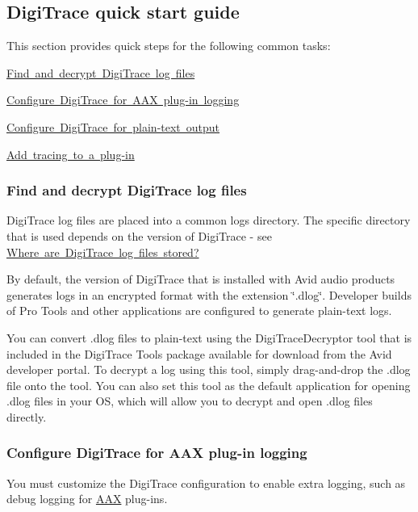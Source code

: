  \hypertarget{a00834_digitrace__quickstart}{}\subsection{Digi\+Trace quick start guide}\label{a00834_digitrace__quickstart}
 This section provides quick steps for the following common tasks\+: \begin{DoxyItemize}
\item \mbox{\hyperlink{a00834_digitrace__gettingstarted__logfiles}{Find and decrypt Digi\+Trace log files}} \item \mbox{\hyperlink{a00834_digitrace__gettingstarted__config}{Configure Digi\+Trace for A\+AX plug-\/in logging}} \item \mbox{\hyperlink{a00834_digitrace__gettingstarted__configurefordevelopment}{Configure Digi\+Trace for plain-\/text output}} \item \mbox{\hyperlink{a00834_digitrace__gettingstarted__addingtracing}{Add tracing to a plug-\/in}}\end{DoxyItemize}
\hypertarget{a00834_digitrace__gettingstarted__logfiles}{}\subsubsection{Find and decrypt Digi\+Trace log files}\label{a00834_digitrace__gettingstarted__logfiles}
 Digi\+Trace log files are placed into a common logs directory. The specific directory that is used depends on the version of Digi\+Trace -\/ see \mbox{\hyperlink{a00834_digitrace__logfiles__wherearethelogs}{Where are Digi\+Trace log files stored?}}

 By default, the version of Digi\+Trace that is installed with Avid audio products generates logs in an encrypted format with the extension \char`\"{}.\+dlog\char`\"{}. Developer builds of Pro Tools and other applications are configured to generate plain-\/text logs.

 You can convert .dlog files to plain-\/text using the Digi\+Trace\+Decryptor tool that is included in the Digi\+Trace Tools package available for download from the Avid developer portal. To decrypt a log using this tool, simply drag-\/and-\/drop the .dlog file onto the tool. You can also set this tool as the default application for opening .dlog files in your OS, which will allow you to decrypt and open .dlog files directly.

\hypertarget{a00834_digitrace__gettingstarted__config}{}\subsubsection{Configure Digi\+Trace for A\+A\+X plug-\/in logging}\label{a00834_digitrace__gettingstarted__config}
 You must customize the Digi\+Trace configuration to enable extra logging, such as debug logging for \mbox{\hyperlink{a00852}{A\+AX}} plug-\/ins.

